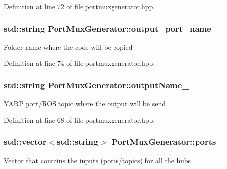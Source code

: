 Definition at line 72 of file portmuxgenerator.\-hpp.

\hypertarget{classPortMuxGenerator_a8a342f9a1ea4fea5be14d05f0ff4b251}{
\subsubsection[{output\-\_\-port\-\_\-name}]{\setlength{\rightskip}{0pt plus 5cm}std\-::string Port\-Mux\-Generator\-::output\-\_\-port\-\_\-name\hspace{0.3cm}{\ttfamily [private]}}}\label{classPortMuxGenerator_a8a342f9a1ea4fea5be14d05f0ff4b251}
Folder name where the code will be copied 

Definition at line 74 of file portmuxgenerator.\-hpp.

\hypertarget{classPortMuxGenerator_a6c459791ee05d68f48e087b4d3cedc68}{
\subsubsection[{output\-Name\-\_\-}]{\setlength{\rightskip}{0pt plus 5cm}std\-::string Port\-Mux\-Generator\-::output\-Name\-\_\-\hspace{0.3cm}{\ttfamily [private]}}}\label{classPortMuxGenerator_a6c459791ee05d68f48e087b4d3cedc68}
Y\-A\-R\-P port/\-R\-O\-S topic where the output will be send 

Definition at line 68 of file portmuxgenerator.\-hpp.

\hypertarget{classPortMuxGenerator_a05ea2374bbae5e1c1bb069a793a3685e}{
\subsubsection[{ports\-\_\-}]{\setlength{\rightskip}{0pt plus 5cm}std\-::vector$<$std\-::string$>$ Port\-Mux\-Generator\-::ports\-\_\-\hspace{0.3cm}{\ttfamily [private]}}}\label{classPortMuxGenerator_a05ea2374bbae5e1c1bb069a793a3685e}
Vector that contains the inputs (ports/topics) for all the hubs 

